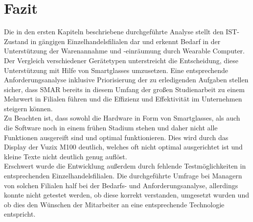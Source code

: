 
\chapter{Fazit}
Die in den ersten Kapiteln beschriebene durchgeführte Analyse stellt den IST-Zustand in gängigen Einzelhandelsfilialen dar und erkennt Bedarf in der Unterstützung der Warenannahme und -einräumung durch Wearable Computer. Der Vergleich verschiedener Gerätetypen unterstreicht die Entscheidung, diese Unterstützung mit Hilfe von Smartglasses umzusetzen. Eine entsprechende Anforderungsanalyse inklusive Priorisierung der zu erledigenden Aufgaben stellen sicher, dass \ac{SMAR} bereits in diesem Umfang der großen Studienarbeit zu einem Mehrwert in Filialen führen und die Effizienz und Effektivität im Unternehmen steigern können.\\

Zu Beachten ist, dass sowohl die Hardware in Form von Smartglasses, als auch die Software noch in einem frühen Stadium stehen und daher nicht alle Funktionen ausgereift sind und optimal funktionieren. Dies wird \zB durch das Display der Vuzix M100 deutlich, welches oft nicht optimal ausgerichtet ist und kleine Texte nicht deutlich genug auflöst.\\

Erschwert wurde die Entwicklung außerdem durch fehlende Testmöglichkeiten in entsprechenden Einzelhandelsfilialen. Die durchgeführte Umfrage bei Managern von solchen Filialen half bei der Bedarfs- und Anforderungsanalyse, allerdings konnte nicht getestet werden, ob diese korrekt verstanden, umgesetzt wurden und ob dies den Wünschen der Mitarbeiter an eine entsprechende Technologie entspricht.\\

